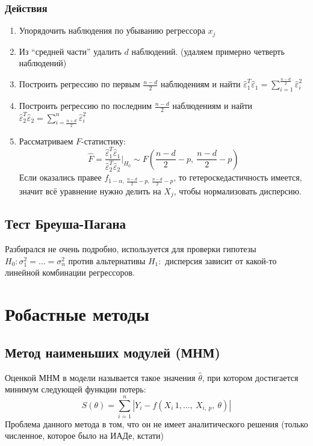 \documentclass[12pt, a4paper]{article}
\begin{document}
\subsubsection*{Действия}
\begin{enumerate}
    \item Упорядочить наблюдения по убыванию регрессора $x_{j}$
    \item Из ``средней части'' удалить $d$ наблюдений. (удаляем примерно четверть наблюдений)
    \item Построить регрессию по первым $\frac{n - d}{2}$ наблюдениям и найти $\hat\varepsilon_1^T \hat\varepsilon_1 = \sum_{i = 1}^{\frac{n - d}{2}} \hat \varepsilon_i^2$ 
    \item Построить регрессию по последним $\frac{n - d}{2}$ наблюдениям и найти $\hat\varepsilon_2^T \hat\varepsilon_2 = \sum_{i = \frac{n + d}{2}}^{n} \hat \varepsilon_i^2$ 
    \item Рассматриваем $F$-статистику:
    \[
    \hat F = \frac{\hat\varepsilon_1^T \hat\varepsilon_1}{\hat\varepsilon_2^T \hat\varepsilon_2} \Bigg|_{H_0} \sim F\left(\frac{n - d}{2} - p,\ \frac{n - d}{2} - p\right)
    \]
    Если оказались правее $f_{1 - \alpha,\ \frac{n - d}{2} - p,\ \frac{n - d}{2} - p}$, то гетероскедастичность имеется, значит всё уравнение нужно делить на $X_j$, чтобы нормализовать дисперсию.
\end{enumerate}
\subsection*{Тест Бреуша-Пагана}
Разбирался не очень подробно, используется для проверки гипотезы $H_0: \sigma_1^2=  \dots = \sigma^2_n$ против альтернативы $H_1:$ дисперсия зависит от какой-то линейной комбинации регрессоров.

\section*{Робастные методы}
\subsection*{Метод наименьших модулей (МНМ)}
Оценкой МНМ в модели называется такое значения $\hat \theta$, при котором достигается минимум следующей функции потерь:
\[
S(\theta) = \sum_{i = 1}^{n} \left| Y_i - f(X_i\, 1,\dots,\ X_{i,\ p},\ \theta) \right|
\]
Проблема данного метода в том, что он не имеет аналитического решения (только численное, которое было на ИАДе, кстати)
\end{document}
